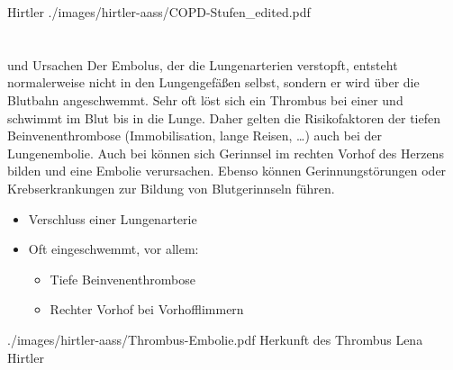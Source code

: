 %

{}
{}
{Hirtler}
{}
{./images/hirtler-aass/COPD-Stufen_edited.pdf}
{}





\nocite{Knacke200601}

\clearpage%

\section{}
\label{topic:lungenembolie}





\TextSlideTeaser
{{\TxBeschreibung} und Ursachen}%
{%
Der Embolus, der die Lungenarterien verstopft, entsteht
normalerweise nicht in den Lungengefäßen selbst, sondern er
wird über die Blutbahn angeschwemmt. Sehr oft löst sich ein Thrombus bei
einer  und schwimmt im Blut bis in
die Lunge. Daher gelten die
Risikofaktoren der tiefen Beinvenenthrombose
(Immobilisation, lange Reisen, \ldots) auch bei der
Lungenembolie. 
Auch bei  können sich Gerinnsel im 
rechten Vorhof des Herzens bilden und eine Embolie verursachen.
Ebenso können
Gerinnungstörungen oder Krebserkrankungen zur Bildung von 
Blutgerinnseln führen.}%
{
\begin{itemize}
  \item Verschluss einer Lungenarterie
  \item Oft eingeschwemmt, vor allem:
  \begin{itemize}
    \item Tiefe Beinvenenthrombose
    \item Rechter Vorhof bei Vorhofflimmern
  \end{itemize}
\end{itemize}}%
{./images/hirtler-aass/Thrombus-Embolie.pdf}%
{Herkunft des Thrombus}%
{}%
{Lena Hirtler}%
{}%



